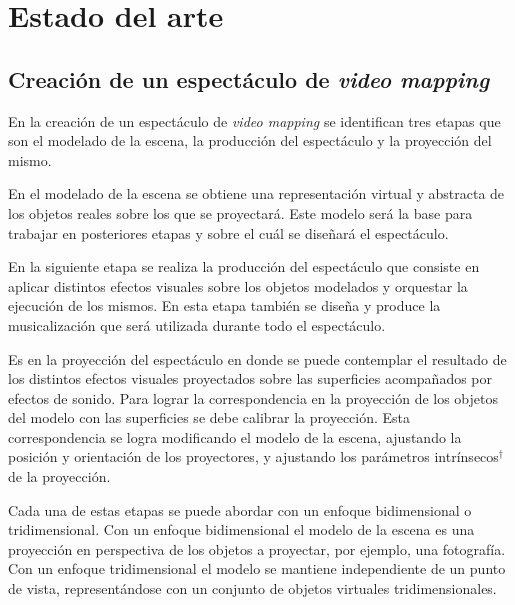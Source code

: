 \chapter{Estado del arte}


\section{Creación de un espectáculo de \emph{video mapping}}

En la creación de un espectáculo de \emph{video mapping} se identifican tres etapas que son el modelado de la escena, la producción del espectáculo y la proyección del mismo.

En el modelado de la escena se obtiene una representación virtual y abstracta de los objetos reales sobre los que se proyectará. Este modelo será la base para trabajar en posteriores etapas y sobre el cuál se diseñará el espectáculo.

En la siguiente etapa se realiza la producción del espectáculo que consiste en aplicar distintos efectos visuales sobre los objetos modelados y orquestar la ejecución de los mismos. En esta etapa también se diseña y produce la musicalización que será utilizada durante todo el espectáculo.

Es en la proyección del espectáculo en donde se puede contemplar el resultado de los distintos efectos visuales proyectados sobre las superficies acompañados por efectos de sonido.
Para lograr la correspondencia en la proyección de los objetos del modelo con las superficies se debe calibrar la proyección. Esta correspondencia se logra modificando el modelo de la escena, ajustando la posición y orientación de los proyectores, y ajustando los parámetros intrínsecos$^\dagger$ de la proyección.

Cada una de estas etapas se puede abordar con un enfoque bidimensional o tridimensional.
Con un enfoque bidimensional el modelo de la escena es una proyección en perspectiva de los objetos a proyectar, por ejemplo, una fotografía. Con un enfoque tridimensional el modelo se mantiene independiente de un punto de vista, representándose con un conjunto de objetos virtuales tridimensionales.


